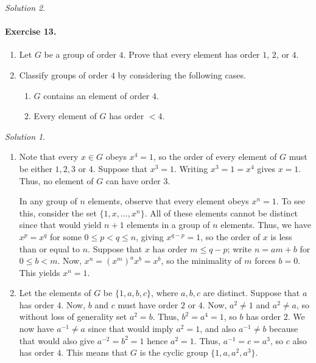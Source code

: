 \documentclass[11pt]{report}
\theoremstyle{remark}
\newtheorem*{solution}{Solution}
\begin{document}
\begin{solution}
    
    \paragraph{Exercise 13.}\mbox{}
    \begin{enumerate}
        \itemsep0em
        \item Let $G$ be a group of order $4$. Prove that every element has order
        $1$, $2$, or $4$.
        \item Classify groups of order $4$ by considering the following cases.
        \begin{enumerate}
            \itemsep0em
            \item $G$ contains an element of order $4$.
            \item Every element of $G$ has order $<4$.
        \end{enumerate}
    \end{enumerate}
    \begin{solution} \mbox{}
    \begin{enumerate}
        \item Note that every $x \in G$ obeys $x^4 = 1$, so the order of every
        element of $G$ must be either $1, 2, 3$ or $4$. Suppose that $x^3 = 1$.
        Writing $x^3 = 1 = x^4$ gives $x = 1$. Thus, no element of $G$ can have
        order $3$.

        In any group of $n$ elements, observe that every element obeys $x^n = 1$. To
        see this, consider the set $\{1, x, \dots, x^n\}$. All of these elements
        cannot be distinct since that would yield $n + 1$ elements in a group of $n$
        elements. Thus, we have $x^p = x^q$ for some $0 \leq p < q \leq n$, giving
        $x^{q - p} = 1$, so the order of $x$ is less than or equal to $n$.
        Suppose that $x$ has order $m \leq q - p$; write $n = am + b$ for $0 \leq b
        < m$. Now, $x^n = (x^m)^ax^b = x^b$, so the minimality of $m$ forces $b =
        0$. This yields $x^n = 1$.

        \item Let the elements of $G$ be $\{1, a, b, c\}$, where $a, b, c$ are distinct.
        Suppose that $a$ has order $4$. Now, $b$ and $c$ must have order $2$ or $4$.
        Now, $a^2 \neq 1$ and $a^2 \neq a$, so without loss of generality set $a^2 =
        b$. Thus, $b^2 = a^4 = 1$, so $b$ has order $2$. We now have $a^{-1} \neq a$
        since that would imply $a^2 = 1$, and also $a^{-1} \neq b$ because that
        would also give $a^{-2} = b^2 = 1$ hence $a^2 = 1$. Thus, $a^{-1} = c =
        a^3$, so $c$ also has order $4$. This means that $G$ is the cyclic group
        $\{1, a, a^2, a^3\}$.


\end{enumerate}
\end{solution}
\end{solution}
\end{document}
